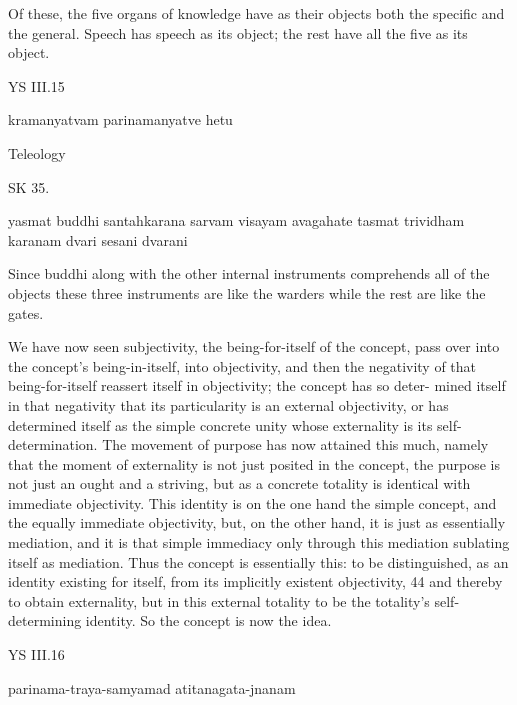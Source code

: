 Of these, the five organs of knowledge have as their objects
both the specific and the general.
Speech has speech as its object;
the rest have all the five as its object.

YS III.15

kramanyatvam parinamanyatve hetu

Teleology

SK 35.

yasmat buddhi santahkarana sarvam visayam avagahate
tasmat trividham karanam dvari sesani dvarani

Since buddhi along with the other internal instruments
comprehends all of the objects these three instruments are
like the warders while the rest are like the gates.

We have now seen subjectivity, the being-for-itself of the concept, pass over
into the concept’s being-in-itself, into objectivity, and then the negativity of
that being-for-itself reassert itself in objectivity; the concept has so deter-
mined itself in that negativity that its particularity is an external objectivity,
or has determined itself as the simple concrete unity whose externality is its
self-determination. The movement of purpose has now attained this much,
namely that the moment of externality is not just posited in the concept,
the purpose is not just an ought and a striving, but as a concrete totality is
identical with immediate objectivity. This identity is on the one hand the
simple concept, and the equally immediate objectivity, but, on the other
hand, it is just as essentially mediation, and it is that simple immediacy only
through this mediation sublating itself as mediation. Thus the concept is
essentially this: to be distinguished, as an identity existing for itself, from
its implicitly existent objectivity, 44 and thereby to obtain externality, but in
this external totality to be the totality’s self-determining identity. So the
concept is now the idea.

YS III.16

parinama-traya-samyamad atitanagata-jnanam

